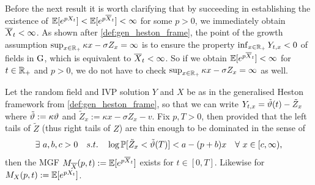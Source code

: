 Before the next result it is worth clarifying that by succeeding in establishing the existence of $\mathbb{E}[e^{pX_t}]<\mathbb{E}[e^{p{\overline{X}}_t}]<\infty$ for some $p>0$, we immediately obtain ${\overline{X}}_t<\infty$. As shown after \autoref{def:gen_heston_frame}, the point of the growth assumption $\sup_{x\in\mathbb{R}_+}\kappa x - \sigma Z_x=\infty$ is to ensure the property $\inf_{x\in\mathbb{R}_+}Y_{t,x}<0$ of fields in $\mathrm{G}$, which is equivalent to ${\overline{X}}_t<\infty$. So if we obtain $\mathbb{E}[e^{p{\overline{X}}_t}]<\infty$ for $t\in\mathbb{R}_+$ and $p>0$, we do not have to check $\sup_{x\in\mathbb{R}_+}\kappa x - \sigma Z_x=\infty$ as well.

\begin{theorem}\label{thm:mgf_existence}
    Let the random field and IVP solution $Y$ and $X$ be as in the generalised Heston framework from \autoref{def:gen_heston_frame}, so that we can write $Y_{t,x}=\tilde{\vartheta}(t)-\tilde{Z}_x$ where $\tilde{\vartheta}:=\kappa\vartheta$ and $\tilde{Z}_x:=\kappa x - \sigma Z_x - v$. Fix $p,T>0$, then provided that the left tails of $\tilde{Z}$ (thus right tails of $Z$) are thin enough to be dominated in the sense of
    \begin{equation}\label{eq:integrable_assumption}
        \exists\ a,b,c>0\quad s.t.\quad \log\mathbb{P}[\tilde{Z}_x < \tilde{\vartheta}(T)] < a - (p+b) x\quad \forall\ x\in[c,\infty),
    \end{equation}
    then the MGF $M_{{\overline{X}}}(p,t):=\mathbb{E}[e^{p{\overline{X}}_t}]$ exists for $t\in[0,T]$. Likewise for $M_{X}(p,t):=\mathbb{E}[e^{pX_t}]$.
\end{theorem}
